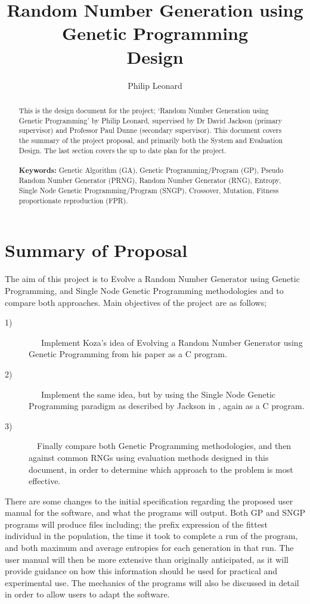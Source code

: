 \documentclass[a4paper,10.5pt]{article}
\title{Random Number Generation using Genetic Programming\\ Design}
\author{Philip Leonard}
\date{}
\begin{document}
\maketitle
\begin{abstract}
This is the design document for the project; `Random Number Generation using Genetic Programming' by Philip Leonard, supervised by Dr David Jackson (primary supervisor) and Professor Paul Dunne (secondary supervisor). This document covers the summary of the project proposal, and primarily both the System and Evaluation Design. The last section covers the up to date plan for the project.\\\\
\textbf{Keywords:} Genetic Algorithm (GA), Genetic Programming/Program (GP), Pseudo Random Number Generator (PRNG), Random Number Generator (RNG), Entropy, Single Node Genetic Programming/Program (SNGP), Crossover, Mutation, Fitness proportionate reproduction (FPR).
\end{abstract}
\newpage
\tableofcontents
\section{Summary of Proposal}
The aim of this project is to Evolve a Random Number Generator using Genetic Programming, and Single Node Genetic Programming methodologies and to compare both approaches. Main objectives of the project are as follows;
\begin{description}
  \item[1)]
  \ \ \ Implement Koza's idea of Evolving a Random Number Generator using Genetic Programming from his paper \cite{kozarng} as a C program.
  \item[2)]
 \ \ \ Implement the same idea, but by using the Single Node Genetic Programming paradigm as described by Jackson in \cite{jacksonsngp2}, again as a C program.
  \item[3)]
  \ \  Finally compare both Genetic Programming methodologies, and then against common RNGs using evaluation methods designed in this document, in order to determine which approach to the problem is most effective. 
\end{description}
There are some changes to the initial specification regarding the proposed user manual for the software, and what the programs will output. Both GP and SNGP programs will produce files including; the prefix expression of the fittest individual in the population, the time it took to complete a run of the program, and both maximum and average entropies for each generation in that run. The user manual will then be more extensive than originally anticipated, as it will provide guidance on how this information should be used for practical and experimental use. The mechanics of the programs will also be discussed in detail in order to allow users to adapt the software.\\
\end{document}
